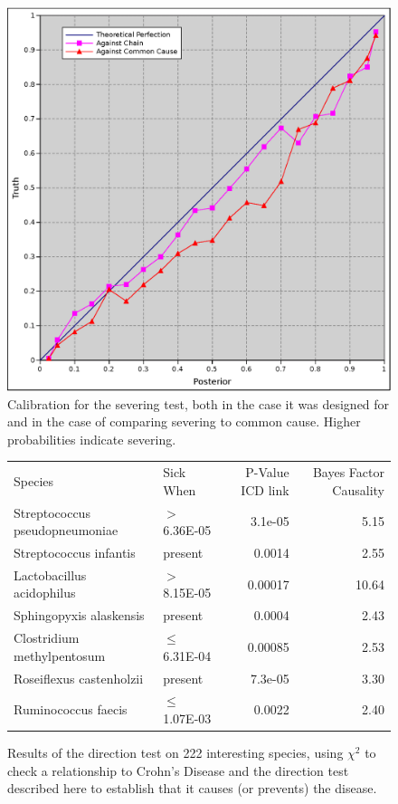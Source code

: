 \documentclass[letterpaper]{article}
\begin{document}
\begin{figure}
  \includegraphics[width=\textwidth]{sever}
  \caption{Calibration for the severing test, both in the case it was
    designed for and in the case of comparing severing to common
    cause.  Higher probabilities indicate severing.}
  \label{sever}
\end{figure}

\begin{figure}
  \begin{tabular}{llrr}
    Species & Sick When & P-Value ICD link & Bayes Factor Causality \\
    Streptococcus pseudopneumoniae & $>$6.36E-05 & 3.1e-05 & 5.15 \\
    Streptococcus infantis & present & 0.0014 & 2.55 \\
    Lactobacillus acidophilus & $>$8.15E-05 & 0.00017 & 10.64 \\
    Sphingopyxis alaskensis & present & 0.0004 & 2.43 \\
    Clostridium methylpentosum & $\leq$6.31E-04 & 0.00085 & 2.53 \\
    Roseiflexus castenholzii & present & 7.3e-05 & 3.30 \\
    Ruminococcus faecis & $\leq$1.07E-03 & 0.0022 & 2.40 \\
  \end{tabular}
  \caption{Results of the direction test on 222 interesting species,
    using $\chi^2$ to check a relationship to Crohn's Disease and the
    direction test described here to establish that it causes (or
    prevents) the disease.}
  \label{dir_tab}
\end{figure}
\end{document}
